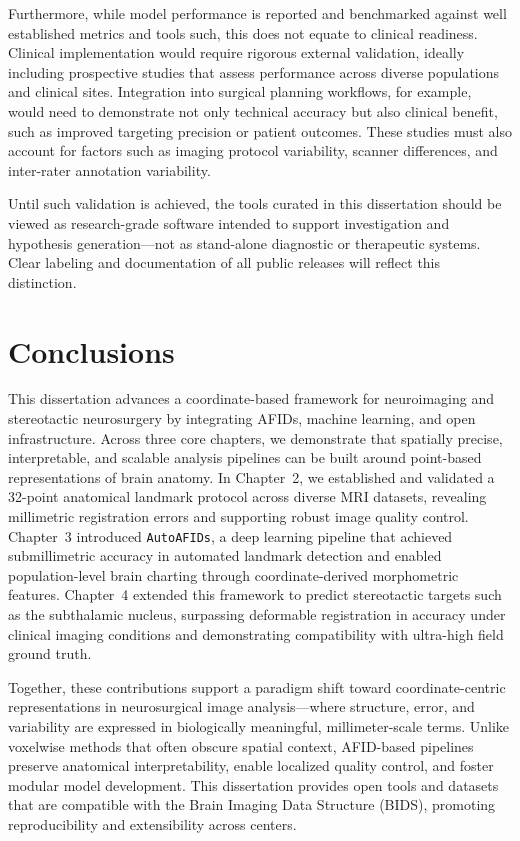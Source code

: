 Furthermore, while model performance is reported and benchmarked against well established metrics and tools such, this does not equate to clinical readiness. Clinical implementation would require rigorous external validation, ideally including prospective studies that assess performance across diverse populations and clinical sites. Integration into surgical planning workflows, for example, would need to demonstrate not only technical accuracy but also clinical benefit, such as improved targeting precision or patient outcomes. These studies must also account for factors such as imaging protocol variability, scanner differences, and inter-rater annotation variability.

Until such validation is achieved, the tools curated in this dissertation should be viewed as research-grade software intended to support investigation and hypothesis generation—not as stand-alone diagnostic or therapeutic systems. Clear labeling and documentation of all public releases will reflect this distinction.

\section{Conclusions}

This dissertation advances a coordinate-based framework for neuroimaging and stereotactic neurosurgery by integrating AFIDs, machine learning, and open infrastructure. Across three core chapters, we demonstrate that spatially precise, interpretable, and scalable analysis pipelines can be built around point-based representations of brain anatomy. In Chapter~2, we established and validated a 32-point anatomical landmark protocol across diverse MRI datasets, revealing millimetric registration errors and supporting robust image quality control. Chapter~3 introduced \texttt{AutoAFIDs}, a deep learning pipeline that achieved submillimetric accuracy in automated landmark detection and enabled population-level brain charting through coordinate-derived morphometric features. Chapter~4 extended this framework to predict stereotactic targets such as the subthalamic nucleus, surpassing deformable registration in accuracy under clinical imaging conditions and demonstrating compatibility with ultra-high field ground truth.

Together, these contributions support a paradigm shift toward coordinate-centric representations in neurosurgical image analysis—where structure, error, and variability are expressed in biologically meaningful, millimeter-scale terms. Unlike voxelwise methods that often obscure spatial context, AFID-based pipelines preserve anatomical interpretability, enable localized quality control, and foster modular model development. This dissertation provides open tools and datasets that are compatible with the Brain Imaging Data Structure (BIDS), promoting reproducibility and extensibility across centers.

